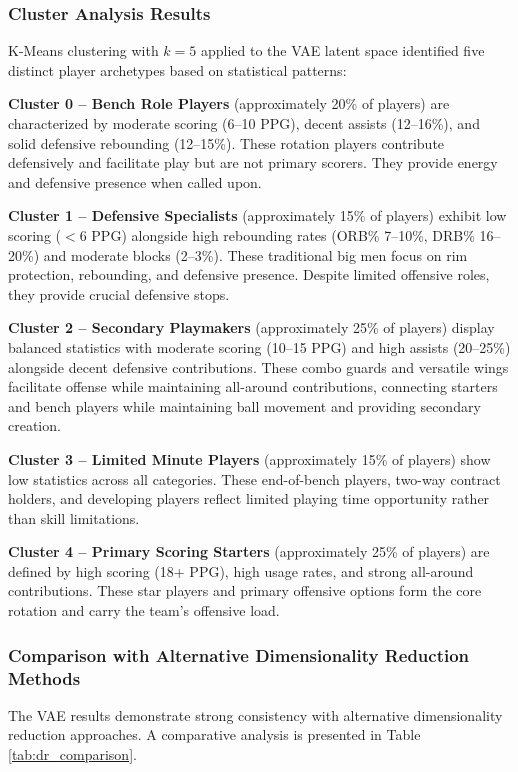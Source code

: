 \documentclass{article}
\begin{document}
\subsubsection{Cluster Analysis Results}

K-Means clustering with $k=5$ applied to the VAE latent space identified five distinct player archetypes based on statistical patterns:

\textbf{Cluster 0 -- Bench Role Players} (approximately 20\% of players) are characterized by moderate scoring (6--10 PPG), decent assists (12--16\%), and solid defensive rebounding (12--15\%). These rotation players contribute defensively and facilitate play but are not primary scorers. They provide energy and defensive presence when called upon.

\textbf{Cluster 1 -- Defensive Specialists} (approximately 15\% of players) exhibit low scoring ($<6$ PPG) alongside high rebounding rates (ORB\% 7--10\%, DRB\% 16--20\%) and moderate blocks (2--3\%). These traditional big men focus on rim protection, rebounding, and defensive presence. Despite limited offensive roles, they provide crucial defensive stops.

\textbf{Cluster 2 -- Secondary Playmakers} (approximately 25\% of players) display balanced statistics with moderate scoring (10--15 PPG) and high assists (20--25\%) alongside decent defensive contributions. These combo guards and versatile wings facilitate offense while maintaining all-around contributions, connecting starters and bench players while maintaining ball movement and providing secondary creation.

\textbf{Cluster 3 -- Limited Minute Players} (approximately 15\% of players) show low statistics across all categories. These end-of-bench players, two-way contract holders, and developing players reflect limited playing time opportunity rather than skill limitations.

\textbf{Cluster 4 -- Primary Scoring Starters} (approximately 25\% of players) are defined by high scoring (18+ PPG), high usage rates, and strong all-around contributions. These star players and primary offensive options form the core rotation and carry the team's offensive load.

\subsubsection{Comparison with Alternative Dimensionality Reduction Methods}

The VAE results demonstrate strong consistency with alternative dimensionality reduction approaches. A comparative analysis is presented in Table \ref{tab:dr_comparison}.
\end{document}
